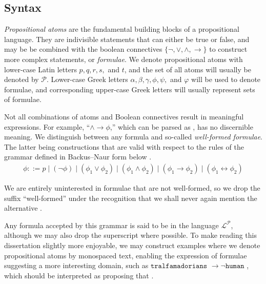 \subsection{Syntax}
\label{subsection:syntax}    
  
 \textit{Propositional atoms} are the fundamental building blocks of a propositional language. They are
indivisible statements that can either be true or false, and may be be combined with the boolean connectives $\{\neg, \lor, \land, \rightarrow
\}$ to construct more complex statements, or \textit{formulae}. We denote propositional atoms with lower-case Latin letters $p,q,r,s,$ and
$t$, and the set of all atoms will usually be denoted by $\mathcal{P}$. Lower-case Greek letters $\alpha, \beta, \gamma, \phi, \psi,$ and
$\varphi$ will be used to denote formulae, and corresponding upper-case Greek letters will usually represent sets of formulae.

Not all combinations of atoms and Boolean connectives result in meaningful expressions. For example, ``$\land \rightarrow \phi$,'' which can
be parsed as , has no discernible meaning. We distinguish between any formula and so-called \textit{well-formed
formulae}. The latter being constructions that are valid with respect to the rules of the grammar defined in Backus--Naur form below
\cite[p. 33]{Huth_Ryan_2004}.
%
\begin{align}
  \phi ::= p \mid (\neg \phi) \mid (\phi_{1}\lor \phi_{2}) \mid (\phi_{1}\land \phi_{2}) \mid (\phi_{1}\rightarrow \phi_{2}) \mid (\phi_{1}\leftrightarrow \phi_{2})
\end{align}

We are entirely uninterested in formulae that are not well-formed, so we drop the suffix ``well-formed'' under the recognition that we shall
never again mention the alternative \cite[p. 33]{Huth_Ryan_2004}.

Any formula accepted by this grammar is said to be in the language $\mathcal{L}^{\mathcal{P}}$, although we may also drop the superscript
where possible. To make reading this dissertation slightly more enjoyable, we may construct examples where we denote propositional atoms by
monospaced text, enabling the expression of formulae suggesting a more interesting domain, such as
$\texttt{tralfamadorians }\rightarrow \neg \texttt{human }$, which should be interpreted as proposing that .

